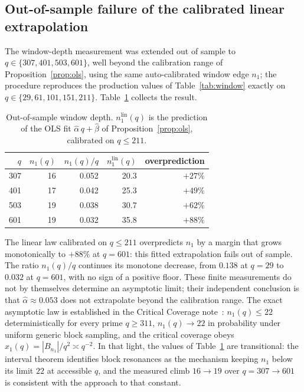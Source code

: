 \documentclass[11pt,a4paper]{article}
\theoremstyle{definition}
\begin{document}
  \subsection{Out-of-sample failure of the calibrated linear extrapolation}

    The window-depth measurement was extended out of sample to $q \in \{307, 401, 503, 601\}$, well
    beyond the calibration range of Proposition~\ref{prop:ols}, using the same auto-calibrated window
    edge $n_1$; the procedure reproduces the production values of Table~\ref{tab:window} exactly on
    $q \in \{29, 61, 101, 151, 211\}$.
    Table~\ref{tab:n1oos} collects the result.

    \begin{table}[ht]
      \centering
      \caption{Out-of-sample window depth.
        $n_1^{\mathrm{lin}}(q)$ is the prediction of the OLS fit $\hat\alpha\,q + \hat\beta$ of
        Proposition~\ref{prop:ols}, calibrated on $q \le 211$.}
      \label{tab:n1oos}
      \begin{tabular}{rrrrr}
        \toprule
        $q$ & $n_1(q)$ & $n_1(q)/q$ & $n_1^{\mathrm{lin}}(q)$ & overprediction \\
        \midrule
        307 & 16 & 0.052 & 20.3 & $+27\%$ \\
        401 & 17 & 0.042 & 25.3 & $+49\%$ \\
        503 & 19 & 0.038 & 30.7 & $+62\%$ \\
        601 & 19 & 0.032 & 35.8 & $+88\%$ \\
        \bottomrule
      \end{tabular}
    \end{table}

    The linear law calibrated on $q \le 211$ overpredicts $n_1$ by a margin that grows monotonically
    to $+88\%$ at $q = 601$: this fitted extrapolation fails out of sample.
    The ratio $n_1(q)/q$ continues its monotone decrease, from $0.138$ at $q = 29$ to $0.032$ at
    $q = 601$, with no sign of a positive floor.
    These finite measurements do not by themselves determine an asymptotic limit; their independent
    conclusion is that $\hat\alpha \approx 0.053$ does not extrapolate beyond the calibration range.
    The exact asymptotic law is established in the Critical Coverage note~\cite{Beau2026ccnote}:
    $n_1(q) \le 22$ deterministically for every prime $q \ge 311$, $n_1(q) \to 22$ in probability
    under uniform generic block sampling, and the critical coverage obeys
    $x_1(q) = |B_{n_1}|/q^2 \asymp q^{-2}$.
    In that light, the values of Table~\ref{tab:n1oos} are transitional: the interval theorem
    identifies block resonances as the mechanism keeping $n_1$ below its limit $22$ at accessible
    $q$, and the measured climb $16 \to 19$ over $q = 307 \to 601$ is consistent with the approach
    to that constant.
\end{document}
